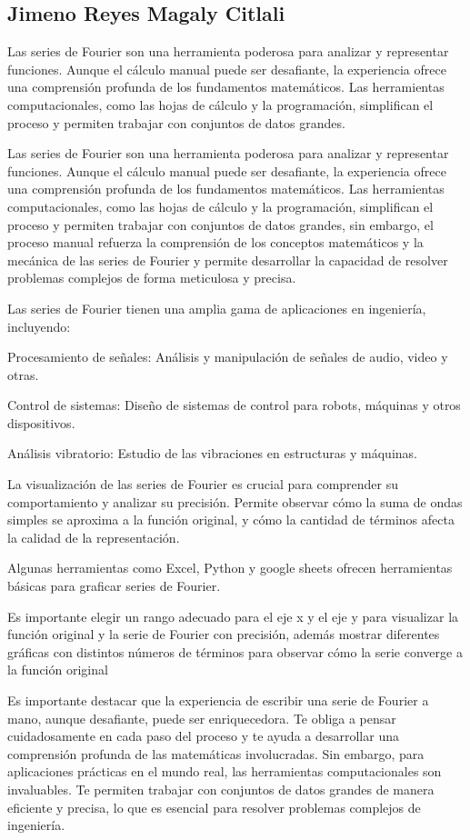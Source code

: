 \subsection{Jimeno Reyes Magaly Citlali }

Las series de Fourier son una herramienta poderosa para analizar y representar funciones. Aunque el cálculo manual puede ser desafiante, la experiencia ofrece una comprensión profunda de los fundamentos matemáticos. Las herramientas computacionales, como las hojas de cálculo y la programación, simplifican el proceso y permiten trabajar con conjuntos de datos grandes.

Las series de Fourier son una herramienta poderosa para analizar y representar funciones. Aunque el cálculo manual puede ser desafiante, la experiencia ofrece una comprensión profunda de los fundamentos matemáticos. Las herramientas computacionales, como las hojas de cálculo y la programación, simplifican el proceso y permiten trabajar con conjuntos de datos grandes, sin embargo, el proceso manual refuerza la comprensión de los conceptos matemáticos y la mecánica de las series de Fourier y permite desarrollar la capacidad de resolver problemas complejos de forma meticulosa y precisa.

Las series de Fourier tienen una amplia gama de aplicaciones en ingeniería, incluyendo:

Procesamiento de señales: Análisis y manipulación de señales de audio, video y otras.

Control de sistemas: Diseño de sistemas de control para robots, máquinas y otros dispositivos.

Análisis vibratorio: Estudio de las vibraciones en estructuras y máquinas.

La visualización de las series de Fourier es crucial para comprender su comportamiento y analizar su precisión. Permite observar cómo la suma de ondas simples se aproxima a la función original, y cómo la cantidad de términos afecta la calidad de la representación.

Algunas herramientas como Excel, Python y google sheets ofrecen herramientas básicas para graficar series de Fourier.

Es importante elegir un rango adecuado para el eje x y el eje y para visualizar la función original y la serie de Fourier con precisión, además mostrar diferentes gráficas con distintos números de términos para observar cómo la serie converge a la función original

Es importante destacar que la experiencia de escribir una serie de Fourier a mano, aunque desafiante, puede ser enriquecedora. Te obliga a pensar cuidadosamente en cada paso del proceso y te ayuda a desarrollar una comprensión profunda de las matemáticas involucradas. Sin embargo, para aplicaciones prácticas en el mundo real, las herramientas computacionales son invaluables. Te permiten trabajar con conjuntos de datos grandes de manera eficiente y precisa, lo que es esencial para resolver problemas complejos de ingeniería.

